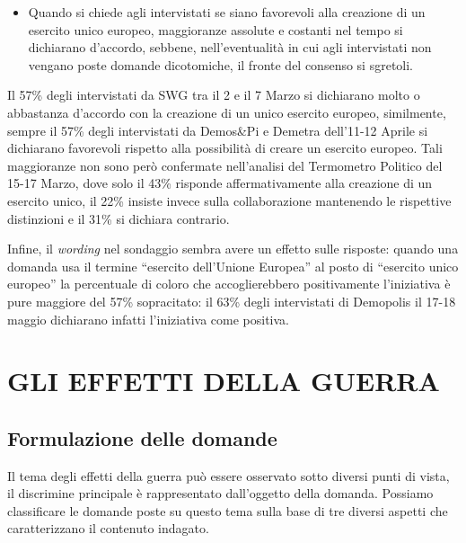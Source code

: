 \documentclass[
]{book}
\providecommand{\tightlist}{%
  \setlength{\itemsep}{0pt}\setlength{\parskip}{0pt}}
\begin{document}
\begin{itemize}
\tightlist
\item
  Quando si chiede agli intervistati se siano favorevoli alla creazione di un esercito unico europeo, maggioranze assolute e costanti nel tempo si dichiarano d'accordo, sebbene, nell'eventualità in cui agli intervistati non vengano poste domande dicotomiche, il fronte del consenso si sgretoli.
\end{itemize}

Il 57\% degli intervistati da SWG tra il 2 e il 7 Marzo si dichiarano molto o abbastanza d'accordo con la creazione di un unico esercito europeo, similmente, sempre il 57\% degli intervistati da Demos\&Pi e Demetra dell'11-12 Aprile si dichiarano favorevoli rispetto alla possibilità di creare un esercito europeo. Tali maggioranze non sono però confermate nell'analisi del Termometro Politico del 15-17 Marzo, dove solo il 43\% risponde affermativamente alla creazione di un esercito unico, il 22\% insiste invece sulla collaborazione mantenendo le rispettive distinzioni e il 31\% si dichiara contrario.

Infine, il \emph{wording} nel sondaggio sembra avere un effetto sulle risposte: quando una domanda usa il termine ``esercito dell'Unione Europea'' al posto di ``esercito unico europeo'' la percentuale di coloro che accoglierebbero positivamente l'iniziativa è pure maggiore del 57\% sopracitato: il 63\% degli intervistati di Demopolis il 17-18 maggio dichiarano infatti l'iniziativa come positiva.

\hypertarget{gli-effetti-della-guerra}{%
\chapter{GLI EFFETTI DELLA GUERRA}\label{gli-effetti-della-guerra}}

\hypertarget{formulazione-delle-domande-4}{%
\section{Formulazione delle domande}\label{formulazione-delle-domande-4}}

Il tema degli effetti della guerra può essere osservato sotto diversi punti di vista, il discrimine principale è rappresentato dall'oggetto della domanda. Possiamo classificare le domande poste su questo tema sulla base di tre diversi aspetti che caratterizzano il contenuto indagato.
\end{document}
